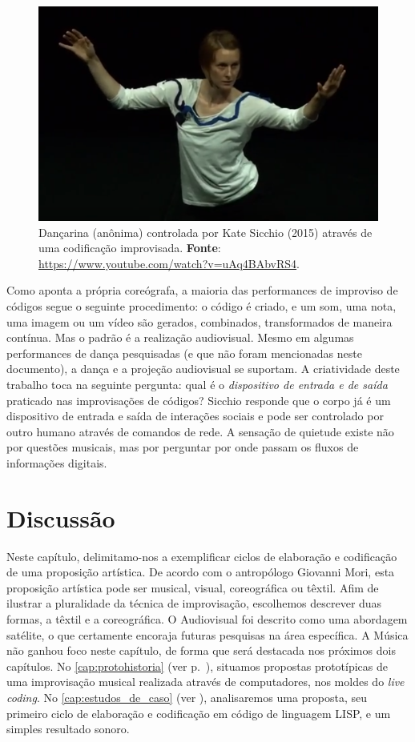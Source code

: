 \begin{figure}[!h]
 \centering
  \includegraphics[scale=0.6]{imagens/iclcdanca.png}
  \caption{Dançarina (anônima) controlada por Kate Sicchio (2015) através de uma codificação improvisada. \textbf{Fonte}: \url{https://www.youtube.com/watch?v=uAq4BAbvRS4}.}
  \label{fig:iclcdanca}
\end{figure}

Como aponta a própria coreógrafa, a maioria das performances de improviso de códigos segue o seguinte procedimento: o código é criado, e um som, uma nota, uma imagem ou um vídeo são gerados, combinados, transformados de maneira contínua. Mas o padrão é a realização audiovisual. Mesmo em algumas performances de dança pesquisadas (e que não foram mencionadas neste documento), a dança e a projeção audiovisual se suportam. A criatividade deste trabalho toca na seguinte pergunta: qual é o \emph{dispositivo de entrada e de saída} praticado nas improvisações de códigos? Sicchio responde que o corpo já é um dispositivo de entrada e saída de interações sociais e pode ser controlado por outro humano através de comandos de rede. A sensação de quietude existe não por questões musicais, mas por perguntar por onde passam os fluxos de informações digitais.

\section{Discussão}

Neste capítulo, delimitamo-nos a exemplificar ciclos de elaboração e codificação de uma proposição artística. De acordo com o antropólogo Giovanni Mori, esta proposição artística pode ser musical, visual, coreográfica ou têxtil. Afim de ilustrar a pluralidade da técnica de improvisação, escolhemos descrever duas formas, a têxtil e a coreográfica. O Audiovisual foi descrito como uma abordagem satélite, o que certamente encoraja futuras pesquisas na área específica.  A Música não ganhou foco neste capítulo, de forma que será destacada nos próximos dois capítulos. No \autoref{cap:protohistoria} (ver p.~\pageref{cap:protohistoria}), situamos propostas prototípicas de uma improvisação musical realizada através de computadores, nos moldes do \emph{live coding}. No \autoref{cap:estudos_de_caso} (ver \pageref{cap:estudos_de_caso}), analisaremos uma proposta, seu primeiro ciclo de elaboração e codificação em código de linguagem LISP, e um simples resultado sonoro.
